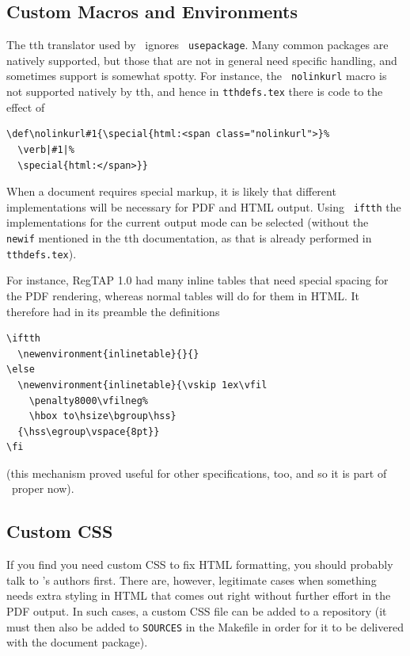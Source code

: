 \documentclass[11pt,a4paper]{ivoa}
\newcommand{\texword}[1]{\texttt{\color{texcolor} #1}}
\begin{document}
\subsection{Custom Macros and Environments}

The tth translator used by \ivoatex\ ignores \texword{usepackage}.  Many
common packages are natively supported, but those that are not in
general need specific handling, and sometimes support is somewhat spotty.
For instance, the \texword{nolinkurl}
macro is not supported natively by tth, and hence in
\texttt{tthdefs.tex} there is code to the effect of
\begin{lstlisting}[basicstyle=\footnotesize]
\def\nolinkurl#1{\special{html:<span class="nolinkurl">}%
  \verb|#1|%
  \special{html:</span>}}
\end{lstlisting}

When a document requires special markup, it is likely that
different implementations will be necessary for PDF and HTML output.
Using \texword{iftth} the implementations for the current output mode
can be selected (without the \texword{newif} mentioned in the tth
documentation, as that is already performed in \texttt{tthdefs.tex}).

For instance, RegTAP 1.0 had many inline tables that need special spacing
for the PDF rendering, whereas normal tables will do for them
in HTML.  It therefore
had in its preamble the definitions
\begin{lstlisting}
\iftth
  \newenvironment{inlinetable}{}{}
\else
  \newenvironment{inlinetable}{\vskip 1ex\vfil
    \penalty8000\vfilneg%
    \hbox to\hsize\bgroup\hss}
  {\hss\egroup\vspace{8pt}}
\fi
\end{lstlisting}

\noindent (this mechanism proved useful for other specifications, too, and so
it is part of \ivoatex~proper now).

\subsection{Custom CSS}
\label{sect:customcss}

If you find you need custom CSS to fix HTML formatting, you should
probably talk to \ivoatex's authors first.  There are, however,
legitimate cases when something needs extra styling in HTML that
comes out right without further effort
in the PDF output.  In such cases, a custom CSS file can
be added to a repository (it must then also be added to \texttt{SOURCES}
in the Makefile in order for it to be delivered with the document
package).
\end{document}
